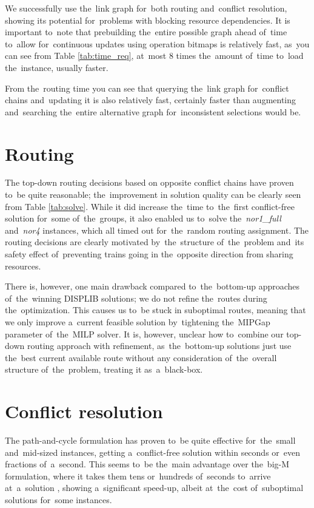 \begin{minipage}{\textwidth}
We successfully use the~link graph for~both routing and~conflict resolution, showing its potential for~problems with blocking resource dependencies. It is important to~note that prebuilding the~entire possible graph ahead of~time to~allow for~continuous updates using operation bitmaps is relatively fast, as~you can see from Table \ref{tab:time_req}, at~most 8 times the~amount of~time to~load the~instance, usually faster.	
\end{minipage}

From the~routing time you can see that querying the~link graph for~conflict chains and~updating it is also relatively fast, certainly faster than augmenting and~searching the~entire alternative graph for~inconsistent selections would be.

\section{Routing}
The top-down routing decisions based on opposite conflict chains have proven to~be quite reasonable; the~improvement in solution quality can be clearly seen from Table \ref{tab:solve}. While it did increase the~time to~the~first conflict-free solution for~some of~the~groups, it also enabled us to~solve the~\emph{nor1\_full} and~\emph{nor4} instances, which all timed out for~the~random routing assignment. The routing decisions are clearly motivated by~the~structure of~the~problem and~its safety effect of~preventing trains going in the~opposite direction from sharing resources.

There is, however, one main drawback compared to~the~bottom-up approaches of~the~winning DISPLIB solutions; we do not refine the~routes during the~optimization. This causes us to~be stuck in suboptimal routes, meaning that we only improve a~current feasible solution by~tightening the~MIPGap parameter of~the~MILP solver. It is, however, unclear how to~combine our top-down routing approach with refinement, as~the~bottom-up solutions just use the~best current available route without any consideration of~the~overall structure of~the~problem, treating it as~a~black-box.

\section{Conflict resolution}
The path-and-cycle formulation has proven to~be quite effective for~the~small and~mid-sized instances, getting a~conflict-free solution within seconds or~even fractions of~a~second. This seems to~be the~main advantage over the~big-M formulation, where it takes them tens or~hundreds of~seconds to~arrive at~a~solution \cite{Dubach2025handling}, showing a~significant speed-up, albeit at~the~cost of~suboptimal solutions for~some instances.

